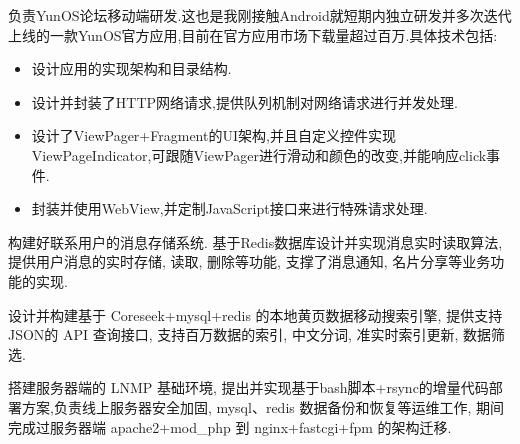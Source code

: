 \documentclass{resume}
\begin{document}
\begin{onehalfspacing}
负责YunOS论坛移动端研发.这也是我刚接触Android就短期内独立研发并多次迭代上线的一款YunOS官方应用,目前在官方应用市场下载量超过百万.具体技术包括:
\begin{itemize}
  \item 设计应用的实现架构和目录结构.
  \item 设计并封装了HTTP网络请求,提供队列机制对网络请求进行并发处理.
  \item 设计了ViewPager+Fragment的UI架构,并且自定义控件实现ViewPageIndicator,可跟随ViewPager进行滑动和颜色的改变,并能响应click事件.
  \item 封装并使用WebView,并定制JavaScript接口来进行特殊请求处理.
\end{itemize}
\end{onehalfspacing}

\begin{onehalfspacing}
构建好联系用户的消息存储系统. 基于Redis数据库设计并实现消息实时读取算法, 提供用户消息的实时存储, 读取, 删除等功能, 支撑了消息通知, 名片分享等业务功能的实现.
\end{onehalfspacing}

\begin{onehalfspacing}
设计并构建基于 Coreseek+mysql+redis 的本地黄页数据移动搜索引擎, 提供支持 JSON的 API 查询接口, 支持百万数据的索引, 中文分词, 准实时索引更新, 数据筛选.
\end{onehalfspacing}

\begin{onehalfspacing}
搭建服务器端的 LNMP 基础环境, 提出并实现基于bash脚本+rsync的增量代码部署方案,负责线上服务器安全加固, mysql、redis 数据备份和恢复等运维工作, 期间完成过服务器端 apache2+mod\_php 到 nginx+fastcgi+fpm 的架构迁移.
\end{onehalfspacing}

\end{document}
